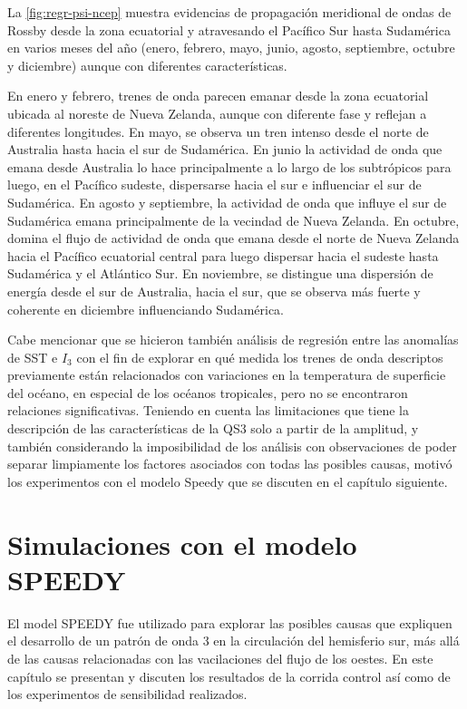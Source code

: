 \documentclass[spanish,a4paper,12pt,oneside]{book}
\begin{document}
La \autoref{fig:regr-psi-ncep} muestra evidencias de propagación
meridional de ondas de Rossby desde la zona ecuatorial y atravesando el
Pacífico Sur hasta Sudamérica en varios meses del año (enero, febrero,
mayo, junio, agosto, septiembre, octubre y diciembre) aunque con
diferentes características.

En enero y febrero, trenes de onda parecen emanar desde la zona
ecuatorial ubicada al noreste de Nueva Zelanda, aunque con diferente
fase y reflejan a diferentes longitudes. En mayo, se observa un tren
intenso desde el norte de Australia hasta hacia el sur de Sudamérica. En
junio la actividad de onda que emana desde Australia lo hace
principalmente a lo largo de los subtrópicos para luego, en el Pacífico
sudeste, dispersarse hacia el sur e influenciar el sur de Sudamérica. En
agosto y septiembre, la actividad de onda que influye el sur de
Sudamérica emana principalmente de la vecindad de Nueva Zelanda. En
octubre, domina el flujo de actividad de onda que emana desde el norte
de Nueva Zelanda hacia el Pacífico ecuatorial central para luego
dispersar hacia el sudeste hasta Sudamérica y el Atlántico Sur. En
noviembre, se distingue una dispersión de energía desde el sur de
Australia, hacia el sur, que se observa más fuerte y coherente en
diciembre influenciando Sudamérica.

Cabe mencionar que se hicieron también análisis de regresión entre las
anomalías de SST e \(I_3\) con el fin de explorar en qué medida los
trenes de onda descriptos previamente están relacionados con variaciones
en la temperatura de superficie del océano, en especial de los océanos
tropicales, pero no se encontraron relaciones significativas. Teniendo
en cuenta las limitaciones que tiene la descripción de las
características de la QS3 solo a partir de la amplitud, y también
considerando la imposibilidad de los análisis con observaciones de poder
separar limpiamente los factores asociados con todas las posibles
causas, motivó los experimentos con el modelo Speedy que se discuten en
el capítulo siguiente.

\chapter{Simulaciones con el modelo
SPEEDY}\label{simulaciones-con-el-modelo-speedy}

El model SPEEDY fue utilizado para explorar las posibles causas que
expliquen el desarrollo de un patrón de onda 3 en la circulación del
hemisferio sur, más allá de las causas relacionadas con las vacilaciones
del flujo de los oestes. En este capítulo se presentan y discuten los
resultados de la corrida control así como de los experimentos de
sensibilidad realizados.
\end{document}
